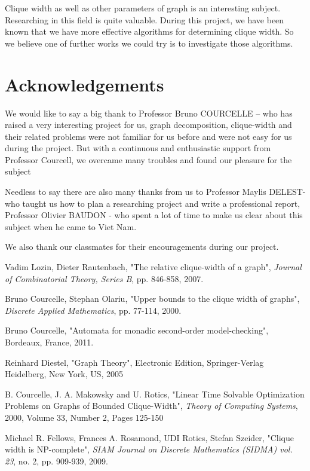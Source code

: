 \documentclass[a4paper, 12pt]{article}
\begin{document}
Clique width as well as other parameters of graph is an interesting subject. Researching in this field is quite valuable. During this project, we have been known that we have more effective algorithms for determining clique width. So we believe one of further works we could try is to investigate those algorithms.

\section {Acknowledgements}
We would like to say a big thank to Professor Bruno COURCELLE – who has raised a very interesting project for us, graph decomposition, clique-width and their related problems were not familiar for us before and were not easy for us during the project. But with a continuous and enthusiastic support from Professor Courcell, we overcame many troubles and found our pleasure for the subject

Needless to say there are also many thanks from us  to Professor Maylis DELEST- who taught us how to plan a researching project and write a professional report, Professor Olivier BAUDON - who spent a lot of time to make us clear about this subject when he came to Viet Nam.

We also thank our classmates for their encouragements during our project.

\begin{thebibliography}{99}


  Vadim Lozin, Dieter Rautenbach, "The relative clique-width of a graph", \textit{Journal of Combinatorial Theory, Series B}, pp. 846-858, 2007.

 Bruno Courcelle, Stephan Olariu, "Upper bounds to the clique width of graphs", \textit{Discrete Applied Mathematics}, pp. 77-114, 2000.

 Bruno Courcelle, "Automata for monadic second-order model-checking", Bordeaux, France, 2011.

 Reinhard Diestel, "Graph Theory", Electronic Edition, Springer-Verlag Heidelberg, New York, US, 2005

 B. Courcelle, J. A. Makowsky and U. Rotics, "Linear Time Solvable Optimization Problems on Graphs of Bounded Clique-Width", \textit {Theory of Computing Systems}, 2000, Volume 33, Number 2, Pages 125-150

 Michael R. Fellows, Frances A. Rosamond, UDI Rotics, Stefan Szeider, "Clique width is NP-complete", \textit {SIAM Journal on Discrete Mathematics (SIDMA) vol. 23}, no. 2, pp. 909-939, 2009. 
\end{thebibliography}
\end{document}
